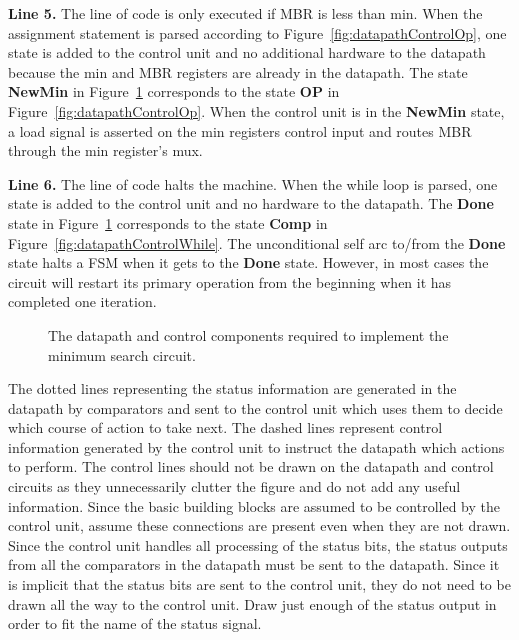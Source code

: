 \textbf{ Line 5.}  The line of code is only executed if MBR is less than min.
When the assignment statement is parsed according to Figure~\ref{fig:datapathControlOp},
one state is added to the control unit and no additional hardware
to the datapath because the min and MBR registers are already in the datapath.
The state \textbf{ NewMin} in Figure~\ref{fig:datapathControlMinSearch} corresponds to the state
\textbf{ OP} in Figure~\ref{fig:datapathControlOp}.  When the control unit is in the \textbf{ NewMin}
state, a load signal is asserted on the min registers control input
and routes MBR through the min register's mux.

\textbf{ Line 6.}  The line of code halts the machine.  When the while loop is parsed,
one state is added to the control unit and no hardware to the
datapath.  The \textbf{ Done} state in Figure~\ref{fig:datapathControlMinSearch} corresponds to
the state \textbf{ Comp} in Figure~\ref{fig:datapathControlWhile}.  The unconditional self arc
to/from the \textbf{ Done} state halts a FSM when it gets to the \textbf{ Done}
state.  However, in most cases the circuit will restart its primary
operation from the beginning when it has completed one iteration.

\begin{figure}[ht]
    \caption{The datapath and control components required to implement
    the minimum search circuit.}
    \label{fig:datapathControlMinSearch}
\end{figure}

The dotted lines representing the status information are generated in the
datapath by comparators and sent to the control unit which uses them to
decide which course of action to take next.  The dashed lines
represent control information generated by the control unit to instruct
the datapath which actions to perform.  The control lines should not be
drawn on the datapath and control circuits as they unnecessarily clutter
the figure and do not add any useful information.  Since the basic
building blocks are assumed to be controlled by the control unit,
assume these connections are present even when they are not drawn.
Since the control unit handles all processing of the status bits,
the status outputs from all the comparators in the datapath must
be sent to the datapath.  Since it is implicit that the status bits
are sent to the control unit, they do not need to be drawn all the
way to the control unit.  Draw just enough of the status output
in order to fit the name of the status signal.

